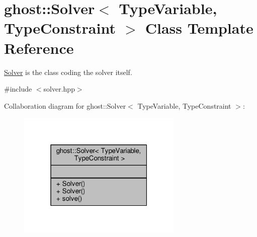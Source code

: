 \hypertarget{classghost_1_1Solver}{}\section{ghost\+:\+:Solver$<$ Type\+Variable, Type\+Constraint $>$ Class Template Reference}
\label{classghost_1_1Solver}


\hyperlink{classghost_1_1Solver}{Solver} is the class coding the solver itself.  




{\ttfamily \#include $<$solver.\+hpp$>$}



Collaboration diagram for ghost\+:\+:Solver$<$ Type\+Variable, Type\+Constraint $>$\+:
\nopagebreak
\begin{figure}[H]
\begin{center}
\leavevmode
\includegraphics[width=223pt]{classghost_1_1Solver__coll__graph}
\end{center}
\end{figure}

